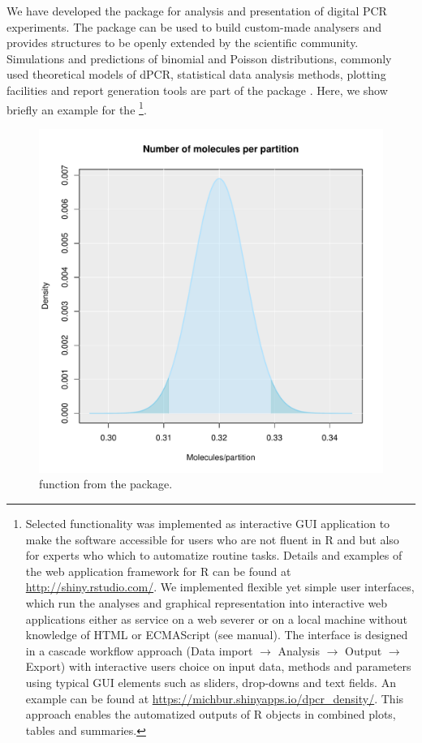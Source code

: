 We have developed the  package for analysis and presentation of 
digital PCR experiments. The  package can be used to build 
custom-made analysers and provides structures to be openly extended by the 
scientific community. Simulations and predictions of binomial and Poisson 
distributions, commonly used theoretical models of dPCR, statistical data 
analysis methods, plotting facilities and report generation tools are part of 
the package \citep{pabinger_2014}. Here, we show briefly an example for the 
\footnote{Selected functionality was implemented as 
interactive GUI application to make the software accessible for 
users who are not fluent in R and but also for experts who which to automatize 
routine tasks. Details and examples of the  web application 
framework for R can be found at \url{http://shiny.rstudio.com/}. We implemented 
flexible yet simple user interfaces, which run the analyses and graphical 
representation into interactive web applications either as service on a web 
severer or on a local machine without knowledge of HTML or ECMAScript (see 
 manual). The interface is designed in a cascade workflow approach 
(Data import $\rightarrow$ Analysis $\rightarrow$ Output $\rightarrow$ Export) 
with interactive users choice on input data, methods and parameters using 
typical GUI elements such as sliders, drop-downs and text fields. An example can 
be found at \url{https://michbur.shinyapps.io/dpcr_density/}. This approach 
enables the automatized outputs of R objects in combined plots, tables and 
summaries.}.

\begin{figure}[htbp]
  \centering
  \includegraphics[clip=true, width=14cm]{figures/dpcR.pdf}
  \caption{ function from the  package.}
  \label{figure:dpcR}
\end{figure}

